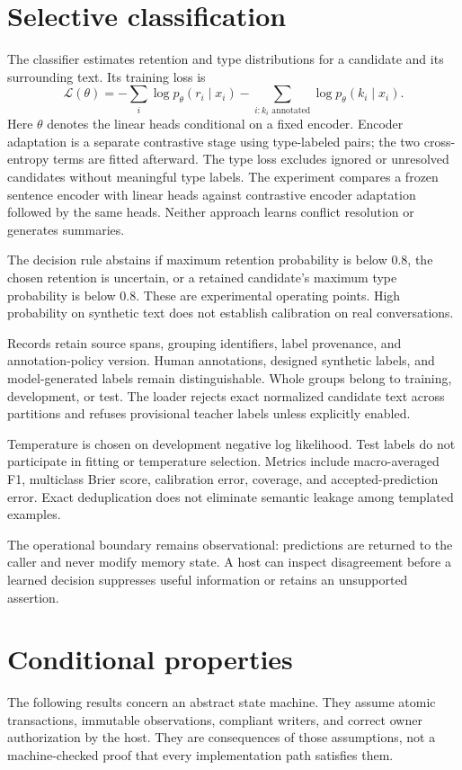 \documentclass[11pt]{article}
\begin{document}
\section{Selective classification}
The classifier estimates retention and type distributions for a candidate and its surrounding text. Its training loss is
\[
 \mathcal{L}(\theta)=
 -\sum_i\log p_\theta(r_i\mid x_i)
 -\sum_{i:k_i\text{ annotated}}\log p_\theta(k_i\mid x_i).
\]
Here $\theta$ denotes the linear heads conditional on a fixed encoder. Encoder adaptation is a separate contrastive stage using type-labeled pairs; the two cross-entropy terms are fitted afterward. The type loss excludes ignored or unresolved candidates without meaningful type labels. The experiment compares a frozen sentence encoder with linear heads against contrastive encoder adaptation followed by the same heads. Neither approach learns conflict resolution or generates summaries.

The decision rule abstains if maximum retention probability is below $0.8$, the chosen retention is uncertain, or a retained candidate's maximum type probability is below $0.8$. These are experimental operating points. High probability on synthetic text does not establish calibration on real conversations.

Records retain source spans, grouping identifiers, label provenance, and annotation-policy version. Human annotations, designed synthetic labels, and model-generated labels remain distinguishable. Whole groups belong to training, development, or test. The loader rejects exact normalized candidate text across partitions and refuses provisional teacher labels unless explicitly enabled.

Temperature is chosen on development negative log likelihood. Test labels do not participate in fitting or temperature selection. Metrics include macro-averaged F1, multiclass Brier score, calibration error, coverage, and accepted-prediction error. Exact deduplication does not eliminate semantic leakage among templated examples.

The operational boundary remains observational: predictions are returned to the caller and never modify memory state. A host can inspect disagreement before a learned decision suppresses useful information or retains an unsupported assertion.

\section{Conditional properties}
The following results concern an abstract state machine. They assume atomic transactions, immutable observations, compliant writers, and correct owner authorization by the host. They are consequences of those assumptions, not a machine-checked proof that every implementation path satisfies them.
\end{document}
